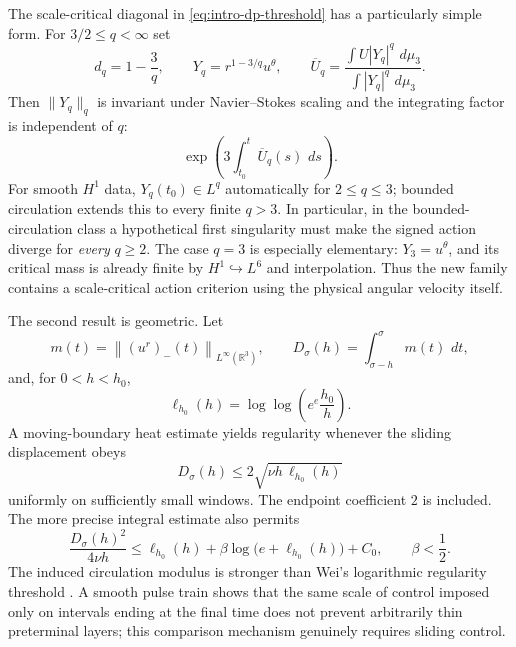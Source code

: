 \documentclass[11pt]{article}
\numberwithin{equation}{section}
\theoremstyle{definition}
\newcommand{\R}{\mathbb R}
\newcommand{\dd}{\,d}
\newcommand{\norm}[1]{\left\lVert #1\right\rVert}
\begin{document}
The scale-critical diagonal in \eqref{eq:intro-dp-threshold} has a particularly simple form.  For $3/2\le q<\infty$ set
\begin{equation}\label{eq:Yq-intro}
 d_q=1-\frac3q,
 \qquad
 Y_q=r^{1-3/q}u^\theta,
 \qquad
 \overline U_q=\frac{\int U|Y_q|^q\,\dd\mu_3}{\int|Y_q|^q\,\dd\mu_3}.
\end{equation}
Then $\|Y_q\|_q$ is invariant under Navier--Stokes scaling and the integrating factor is independent of $q$:
\begin{equation}\label{eq:intro-universal-factor}
 \exp\left(3\int_{t_0}^t\overline U_q(s)\,\dd s\right).
\end{equation}
For smooth $H^1$ data, $Y_q(t_0)\in L^q$ automatically for $2\le q\le3$; bounded circulation extends this to every finite $q>3$.  In particular, in the bounded-circulation class a hypothetical first singularity must make the signed action diverge for \emph{every} $q\ge2$.  The case $q=3$ is especially elementary: $Y_3=u^\theta$, and its critical mass is already finite by $H^1\hookrightarrow L^6$ and interpolation.  Thus the new family contains a scale-critical action criterion using the physical angular velocity itself.

The second result is geometric.  Let
\begin{equation}\label{eq:mDintro}
 m(t)=\norm{(u^r)_-(t)}_{L^\infty(\R^3)},
 \qquad
 D_\sigma(h)=\int_{\sigma-h}^{\sigma}m(t)\,\dd t,
\end{equation}
and, for $0<h<h_0$,
\begin{equation}\label{eq:ell}
 \ell_{h_0}(h)=\log\log\left(e^e\frac{h_0}{h}\right).
\end{equation}
A moving-boundary heat estimate yields regularity whenever the sliding displacement obeys
\begin{equation}\label{eq:intro-petro}
 D_\sigma(h)\le2\sqrt{\nu h\,\ell_{h_0}(h)}
\end{equation}
uniformly on sufficiently small windows.  The endpoint coefficient $2$ is included.  The more precise integral estimate also permits
\begin{equation}\label{eq:intro-petro-secondary}
 \frac{D_\sigma(h)^2}{4\nu h}
 \le \ell_{h_0}(h)+\beta\log\!\bigl(e+\ell_{h_0}(h)\bigr)+C_0,
 \qquad \beta<\frac12.
\end{equation}
The induced circulation modulus is stronger than Wei's logarithmic regularity threshold \cite{Wei2016}.  A smooth pulse train shows that the same scale of control imposed only on intervals ending at the final time does not prevent arbitrarily thin preterminal layers; this comparison mechanism genuinely requires sliding control.
\end{document}
